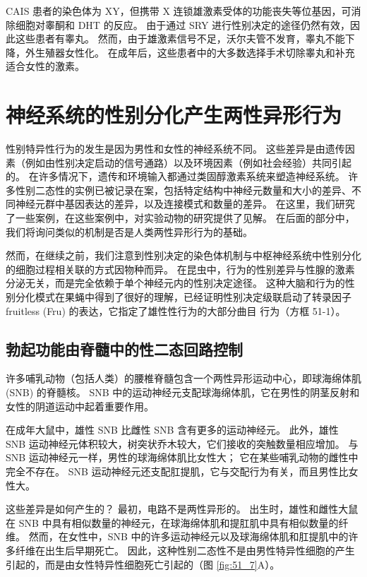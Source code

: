 CAIS 患者的染色体为 XY，但携带 X 连锁雄激素受体的功能丧失等位基因，可消除细胞对睾酮和 DHT 的反应。 由于通过 SRY 进行性别决定的途径仍然有效，因此这些患者有睾丸。 然而，由于雄激素信号不足，沃尔夫管不发育，睾丸不能下降，外生殖器女性化。 在成年后，这些患者中的大多数选择手术切除睾丸和补充适合女性的激素。

\section{神经系统的性别分化产生两性异形行为}
性别特异性行为的发生是因为男性和女性的神经系统不同。 这些差异是由遗传因素（例如由性别决定启动的信号通路）以及环境因素（例如社会经验）共同引起的。 在许多情况下，遗传和环境输入都通过类固醇激素系统来塑造神经系统。 许多性别二态性的实例已被记录在案，包括特定结构中神经元数量和大小的差异、不同神经元群中基因表达的差异，以及连接模式和数量的差异。 在这里，我们研究了一些案例，在这些案例中，对实验动物的研究提供了见解。 在后面的部分中，我们将询问类似的机制是否是人类两性异形行为的基础。

然而，在继续之前，我们注意到性别决定的染色体机制与中枢神经系统中性别分化的细胞过程相关联的方式因物种而异。 在昆虫中，行为的性别差异与性腺的激素分泌无关，而是完全依赖于单个神经元内的性别决定途径。 这种大脑和行为的性别分化模式在果蝇中得到了很好的理解，已经证明性别决定级联启动了转录因子 fruitless (Fru) 的表达，它指定了雄性性行为的大部分曲目 行为（方框 51-1）。

\subsection{勃起功能由脊髓中的性二态回路控制}
许多哺乳动物（包括人类）的腰椎脊髓包含一个两性异形运动中心，即球海绵体肌 (SNB) 的脊髓核。 SNB 中的运动神经元支配球海绵体肌，它在男性的阴茎反射和女性的阴道运动中起着重要作用。

在成年大鼠中，雄性 SNB 比雌性 SNB 含有更多的运动神经元。 此外，雄性 SNB 运动神经元体积较大，树突状乔木较大，它们接收的突触数量相应增加。 与 SNB 运动神经元一样，男性的球海绵体肌比女性大； 它在某些哺乳动物的雌性中完全不存在。 SNB 运动神经元还支配肛提肌，它与交配行为有关，而且男性比女性大。


这些差异是如何产生的？ 最初，电路不是两性异形的。 出生时，雄性和雌性大鼠在 SNB 中具有相似数量的神经元，在球海绵体肌和提肛肌中具有相似数量的纤维。 然而，在女性中，SNB 中的许多运动神经元以及球海绵体肌和肛提肌中的许多纤维在出生后早期死亡。 因此，这种性别二态性不是由男性特异性细胞的产生引起的，而是由女性特异性细胞死亡引起的（图 \ref{fig:51_7}A）。

